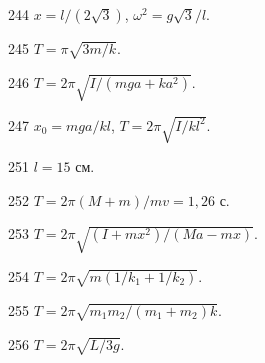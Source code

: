 \begin{Answer}{244}
$x = l/(2\sqrt{3})$, $\omega^2 = g\sqrt{3} / l$.
\end{Answer}
\begin{Answer}{245}
$T =  \pi\sqrt{3m/k}$.
\end{Answer}
\begin{Answer}{246}
$T = 2 \pi \sqrt{I/(mga + ka^2)}$.
\end{Answer}
\begin{Answer}{247}
$x_0 = mga/kl$, $T = 2 \pi \sqrt{I/kl^2}$.
\end{Answer}
\begin{Answer}{251}
$l = 15$ см.
\end{Answer}
\begin{Answer}{252}
$T = 2 \pi (M+m) / mv = 1,26$ с.
\end{Answer}
\begin{Answer}{253}
$T = 2 \pi \sqrt{(I+mx^2)/(Ma - mx)}$.
\end{Answer}
\begin{Answer}{254}
$T = 2 \pi \sqrt{m(1/k_1 + 1/k_2)}$.
\end{Answer}
\begin{Answer}{255}
$T = 2 \pi \sqrt{m_1m_2/(m_1 + m_2)k}$.
\end{Answer}
\begin{Answer}{256}
$T = 2 \pi \sqrt{L/3g}$.
\end{Answer}

